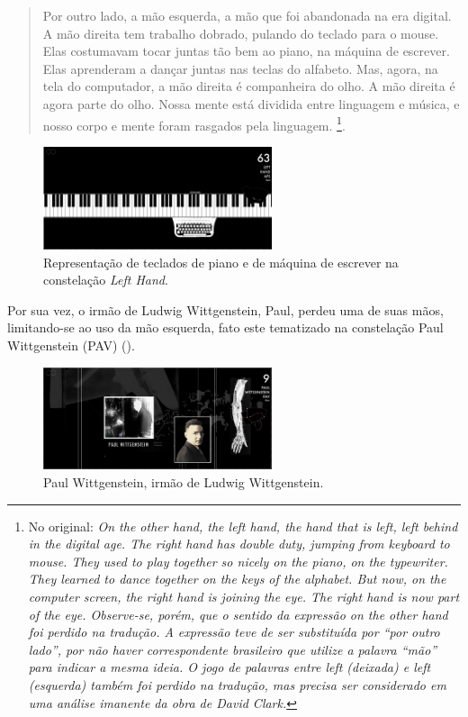 \documentclass[portuguese]{textolivre}
\begin{document}
\begin{quote}
Por outro lado, a mão esquerda, a mão que foi abandonada na era digital. A mão direita tem trabalho dobrado, pulando do teclado para o mouse. Elas costumavam tocar juntas tão bem ao piano, na máquina de escrever. Elas aprenderam a dançar juntas nas teclas do alfabeto. Mas, agora, na tela do computador, a mão direita é companheira do olho. A mão direita é agora parte do olho. Nossa mente está dividida entre linguagem e música, e nosso corpo e mente foram rasgados pela linguagem. \cite[n. p.]{clark2010}\footnote{No original: \emph{On the other hand, the left hand, the hand that is left, left behind in the digital age. The right hand has double duty, jumping from keyboard to mouse. They used to play together so nicely on the piano, on the typewriter. They learned to dance together on the keys of the alphabet. But now, on the computer screen, the right hand is joining the eye. The right hand is now part of the eye. Observe-se, porém, que o sentido da expressão on the other hand foi perdido na tradução. A expressão teve de ser substituída por “por outro lado”, por não haver correspondente brasileiro que utilize a palavra “mão” para indicar a mesma ideia. O jogo de palavras entre left (deixada) e left (esquerda) também foi perdido na tradução, mas precisa ser considerado em uma análise imanente da obra de David Clark.}}.
\end{quote}

\begin{figure}[htbp]
 \centering
 \includegraphics[width=0.6\textwidth]{Fig15[1].jpg}
 \caption{Representação de teclados de piano e de máquina de escrever na constelação \emph{Left Hand}.}
 \label{fig15}
\end{figure}

Por sua vez, o irmão de Ludwig Wittgenstein, Paul, perdeu uma de suas mãos, limitando-se ao uso da mão esquerda, fato este tematizado na constelação Paul Wittgenstein (PAV) (). 

\begin{figure}[htbp]
 \centering
 \includegraphics[width=0.6\textwidth]{Fig16[1].jpg}
 \caption{Paul Wittgenstein, irmão de Ludwig Wittgenstein.}
 \label{fig16}
\end{figure}
\end{document}
